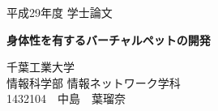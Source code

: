 \thispagestyle{empty}
\begin{center}
{\Large 平成29年度 学士論文}\\

\vspace{3cm}

\textbf{{\LARGE  身体性を有するバーチャルペットの開発}}\\
\vspace{2mm}

\vspace{11cm}

{\Large 千葉工業大学}\\
\vspace{2mm}
{\Large 情報科学部 情報ネットワーク学科}\\
\vspace{4mm}
{\Large 1432104　中島　葉瑠奈}\\

\end{center}

\vspace{4cm}

\begin{flushright}
\hspace{5cm}{\Large 指導教員}\underline{\hspace{2cm}{\Large 菅原　研次}}\\
\vspace{4mm}
\underline{\hspace{20mm}{\Large 真部　雄介}}\\
\end{flushright}


\newpage
{}
\setcounter{page}{1}
\tableofcontents
\listoffigures
\listoftables

\newpage
{}
\setcounter{page}{1}

